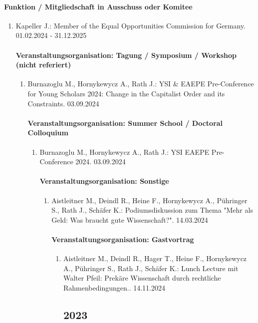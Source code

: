 \begin{enumerate}[leftmargin=*, labelsep=0.5cm]
\begin{enumerate}[leftmargin=*, labelsep=0.5cm]
\begin{enumerate}[leftmargin=*, labelsep=0.5cm]
\begin{enumerate}[leftmargin=*, labelsep=0.5cm]
\begin{enumerate}[leftmargin=*, labelsep=0.5cm]
\begin{enumerate}[leftmargin=*, labelsep=0.5cm]
\begin{enumerate}[leftmargin=*, labelsep=0.5cm]
\begin{enumerate}[leftmargin=*, labelsep=0.5cm]
\paragraph{Funktion / Mitgliedschaft in Ausschuss oder Komitee} 
\begin{enumerate}[leftmargin=*, labelsep=0.5cm] 
 	 \item Kapeller J.: Member of the Equal Opportunities Commission for Germany. 01.02.2024 - 31.12.2025 
\paragraph{Veranstaltungsorganisation: Tagung / Symposium / Workshop (nicht referiert)} 
\begin{enumerate}[leftmargin=*, labelsep=0.5cm] 
 	 \item Burnazoglu M., Hornykewycz A., Rath J.: YSI & EAEPE Pre-Conference for Young Scholars 2024: Change in the Capitalist Order and its Constraints. 03.09.2024 
\paragraph{Veranstaltungsorganisation: Summer School / Doctoral Colloquium} 
\begin{enumerate}[leftmargin=*, labelsep=0.5cm] 
 	 \item Burnazoglu M., Hornykewycz A., Rath J.: YSI EAEPE Pre-Conference 2024. 03.09.2024 
\paragraph{Veranstaltungsorganisation: Sonstige} 
\begin{enumerate}[leftmargin=*, labelsep=0.5cm] 
 	 \item Aistleitner M., Deindl R., Heine F., Hornykewycz A., Pühringer S., Rath J., Schäfer K.: Podiumsdiskussion zum Thema "Mehr als Geld: Was braucht gute Wissenschaft?". 14.03.2024 
\paragraph{Veranstaltungsorganisation: Gastvortrag} 
\begin{enumerate}[leftmargin=*, labelsep=0.5cm] 
 	 \item Aistleitner M., Deindl R., Hager T., Heine F., Hornykewycz A., Pühringer S., Rath J., Schäfer K.: Lunch Lecture mit Walter Pfeil: Prekäre Wissenschaft durch rechtliche Rahmenbedingungen.. 14.11.2024 
\subsection{2023} 

\end{enumerate}
\end{enumerate}
\end{enumerate}
\end{enumerate}
\end{enumerate}
\end{enumerate}
\end{enumerate}
\end{enumerate}
\end{enumerate}
\end{enumerate}
\end{enumerate}
\end{enumerate}
\end{enumerate}
